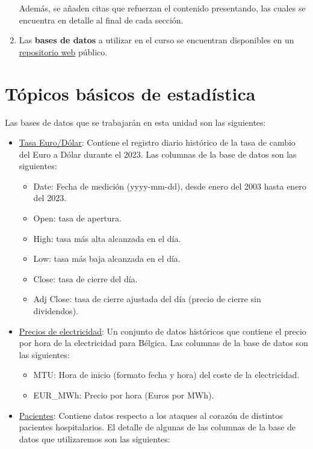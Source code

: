 \documentclass[
  11pt,
]{book}
\providecommand{\tightlist}{%
  \setlength{\itemsep}{0pt}\setlength{\parskip}{0pt}}
\theoremstyle{definition}
\theoremstyle{definition}
\theoremstyle{definition}
\theoremstyle{definition}
\theoremstyle{remark}
\begin{document}
\begin{enumerate}
  Además, se añaden citas que refuerzan el contenido presentando, las cuales se encuentra en detalle al final de cada sección.
\item
  Las \textbf{bases de datos} a utilizar en el curso se encuentran disponibles en un \href{https://github.com/Dfranzani/Bases-de-datos-para-cursos}{repositorio web} público.
\end{enumerate}

\chapter{Tópicos básicos de estadística}\label{unidad1}

Las bases de datos que se trabajarán en esta unidad son las siguientes:

\begin{itemize}
\item
  \label{TasaEURUSD}\href{https://raw.githubusercontent.com/Dfranzani/Bases-de-datos-para-cursos/main/2023-1/Tasa\%2Beuro\%2Bdolar\%2Bhistorica2023.csv}{Tasa Euro/Dólar}: Contiene el registro diario histórico de la tasa de cambio del Euro a Dólar durante el 2023. Las columnas de la base de datos son las siguientes:

  \begin{itemize}
  \tightlist
  \item
    Date: Fecha de medición (yyyy-mm-dd), desde enero del 2003 hasta enero del 2023.
  \item
    Open: tasa de apertura.
  \item
    High: tasa más alta alcanzada en el día.
  \item
    Low: tasa más baja alcanzada en el día.
  \item
    Close: tasa de cierre del día.
  \item
    Adj Close: tasa de cierre ajustada del día (precio de cierre sin dividendos).
  \end{itemize}
\item
  \label{PreciosElectricidad}\href{https://raw.githubusercontent.com/Dfranzani/Bases-de-datos-para-cursos/main/2024-1/Belgian\%20Electricity\%20Prices.csv}{Precios de electricidad}: Un conjunto de datos históricos que contiene el precio por hora de la electricidad para Bélgica. Las columnas de la base de datos son las siguientes:

  \begin{itemize}
  \tightlist
  \item
    MTU: Hora de inicio (formato fecha y hora) del coste de la electricidad.
  \item
    EUR\_MWh: Precio por hora (Euros por MWh).
  \end{itemize}
\item
  \label{Pacientes}\href{https://raw.githubusercontent.com/Dfranzani/Bases-de-datos-para-cursos/main/2023-1/Heart+complete.csv}{Pacientes}: Contiene datos respecto a los ataques al corazón de distintos pacientes hospitalarios. El detalle de algunas de las columnas de la base de datos que utilizaremos son las siguientes:


\end{itemize}
\end{document}
